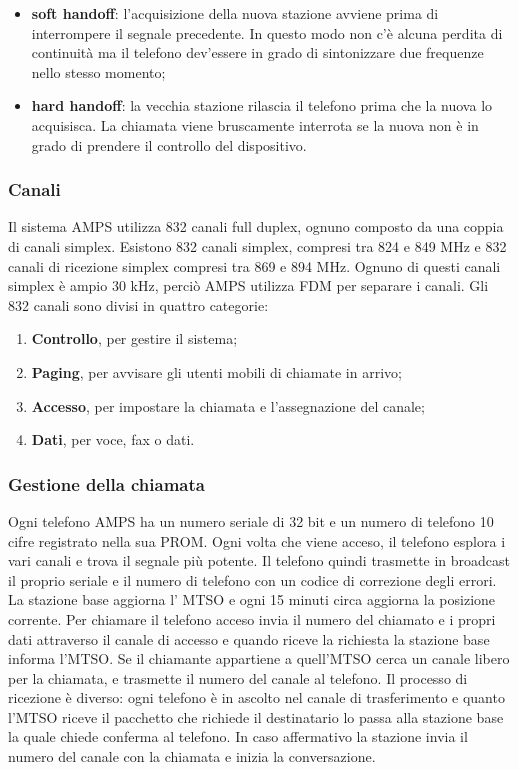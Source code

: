 \begin{itemize}

\item{\textbf{soft handoff}: l'acquisizione della nuova stazione avviene prima di interrompere il segnale precedente. In questo modo non c'è alcuna perdita di continuità ma il telefono dev'essere in grado di sintonizzare due frequenze nello stesso momento};
\item{\textbf{hard handoff}: la vecchia stazione rilascia il telefono prima che la nuova lo acquisisca. La chiamata viene bruscamente interrota se la nuova non è in grado di prendere il controllo del dispositivo}.

\end{itemize}

\subsubsection*{Canali}

Il sistema AMPS utilizza 832 canali full duplex, ognuno composto da una coppia di canali simplex. Esistono 832 canali simplex, compresi tra 824 e 849 MHz e 832 canali di ricezione simplex compresi tra 869 e 894 MHz. Ognuno di questi canali simplex è ampio 30 kHz, perciò AMPS utilizza FDM per separare i canali.
Gli 832 canali sono divisi in quattro categorie:

\begin{enumerate}

\item{\textbf{Controllo}, per gestire il sistema};
\item{\textbf{Paging}, per avvisare gli utenti mobili di chiamate in arrivo};
\item{\textbf{Accesso}, per impostare la chiamata e l'assegnazione del canale};
\item{\textbf{Dati}, per voce, fax o dati}.

\end{enumerate}

\subsubsection*{Gestione della chiamata}

Ogni telefono AMPS ha un numero seriale di 32 bit e un numero di telefono 10 cifre registrato nella sua PROM. Ogni volta che viene acceso, il telefono esplora i vari canali e trova il segnale più potente. Il telefono quindi trasmette in broadcast il proprio seriale e il numero di telefono con un codice di correzione degli errori. La stazione base aggiorna l' MTSO e ogni 15 minuti circa aggiorna la posizione corrente. Per chiamare il telefono acceso invia il numero del chiamato e i propri dati attraverso il canale di accesso e quando riceve la richiesta la stazione base informa l'MTSO. Se il chiamante appartiene a quell'MTSO cerca un canale libero per la chiamata, e trasmette il numero del canale al telefono. Il processo di ricezione è diverso: ogni telefono è in ascolto nel canale di trasferimento e quanto l'MTSO riceve il pacchetto che richiede il destinatario lo passa alla stazione base la quale chiede conferma al telefono. In caso affermativo la stazione invia il numero del canale con la chiamata e inizia la conversazione.

